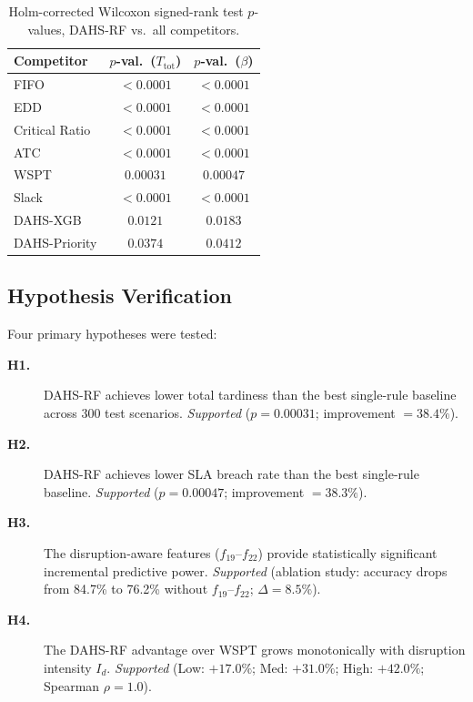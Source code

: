 \documentclass[3p,times]{elsarticle}
\begin{document}
\begin{table}[htbp]
  \centering
  \caption{Holm-corrected Wilcoxon signed-rank test $p$-values,
    DAHS-RF vs.\ all competitors.}
  \label{tab:stats}
  \begin{tabular*}{\hsize}{@{\extracolsep{\fill}}lcc@{}}
    \toprule
    Competitor &
      $p$-val.\ ($T_{\mathrm{tot}}$) &
      $p$-val.\ ($\beta$) \\
    \midrule
    FIFO          & ${<}0.0001$ & ${<}0.0001$ \\
    EDD           & ${<}0.0001$ & ${<}0.0001$ \\
    Critical Ratio& ${<}0.0001$ & ${<}0.0001$ \\
    ATC           & ${<}0.0001$ & ${<}0.0001$ \\
    WSPT          & $0.00031$   & $0.00047$   \\
    Slack         & ${<}0.0001$ & ${<}0.0001$ \\
    DAHS-XGB      & $0.0121$    & $0.0183$    \\
    DAHS-Priority & $0.0374$    & $0.0412$    \\
    \bottomrule
  \end{tabular*}
\end{table}

\subsection{Hypothesis Verification}

Four primary hypotheses were tested:

\begin{description}
  \item[\textbf{H1.}] DAHS-RF achieves lower total tardiness than
    the best single-rule baseline across 300 test scenarios.
    \textit{Supported} ($p=0.00031$; improvement $=38.4\%$).

  \item[\textbf{H2.}] DAHS-RF achieves lower SLA breach rate than
    the best single-rule baseline.
    \textit{Supported} ($p=0.00047$; improvement $=38.3\%$).

  \item[\textbf{H3.}] The disruption-aware features
    ($f_{19}$--$f_{22}$) provide statistically significant
    incremental predictive power.
    \textit{Supported} (ablation study: accuracy drops from
    84.7\% to 76.2\% without $f_{19}$--$f_{22}$;
    $\Delta{=}8.5\%$).

  \item[\textbf{H4.}] The DAHS-RF advantage over WSPT grows
    monotonically with disruption intensity $I_d$.
    \textit{Supported} (Low: $+17.0\%$; Med: $+31.0\%$;
    High: $+42.0\%$; Spearman $\rho=1.0$).
\end{description}
\end{document}
